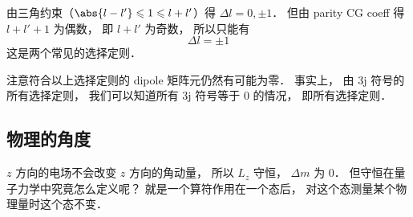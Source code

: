 由三角约束（$\abs{l-l'} \leqslant 1 \leqslant l + l'$）得 $\Delta l = 0, \pm 1$． 但由 parity CG coeff 得 $l + l' + 1$ 为偶数， 即 $l + l'$ 为奇数， 所以只能有
\begin{equation}
 \Delta l = \pm 1
\end{equation}
这是两个常见的选择定则．

注意符合以上选择定则的 dipole 矩阵元仍然有可能为零． 事实上， 由 3j 符号的所有选择定则， 我们可以知道所有 3j 符号等于 0 的情况， 即所有选择定则．

\subsection{物理的角度}
$z$ 方向的电场不会改变 $z$ 方向的角动量， 所以 $L_z$ 守恒， $\Delta m$ 为 0． 但守恒在量子力学中究竟怎么定义呢？ 就是一个算符作用在一个态后， 对这个态测量某个物理量时这个态不变．


